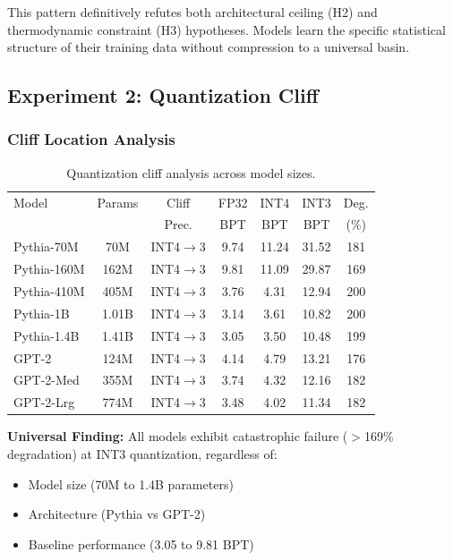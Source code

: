 \documentclass[11pt,a4paper]{article}
\begin{document}
This pattern definitively refutes both architectural ceiling (H2) and thermodynamic constraint (H3) hypotheses. Models learn the specific statistical structure of their training data without compression to a universal basin.

\subsection{Experiment 2: Quantization Cliff}

\subsubsection{Cliff Location Analysis}

\begin{table}[h]
\centering
\small
\begin{tabular}{lcccccc}
\toprule
Model & Params & Cliff & FP32 & INT4 & INT3 & Deg. \\
 & & Prec. & BPT & BPT & BPT & (\%) \\
\midrule
Pythia-70M & 70M & INT4$\rightarrow$3 & 9.74 & 11.24 & 31.52 & 181 \\
Pythia-160M & 162M & INT4$\rightarrow$3 & 9.81 & 11.09 & 29.87 & 169 \\
Pythia-410M & 405M & INT4$\rightarrow$3 & 3.76 & 4.31 & 12.94 & 200 \\
Pythia-1B & 1.01B & INT4$\rightarrow$3 & 3.14 & 3.61 & 10.82 & 200 \\
Pythia-1.4B & 1.41B & INT4$\rightarrow$3 & 3.05 & 3.50 & 10.48 & 199 \\
GPT-2 & 124M & INT4$\rightarrow$3 & 4.14 & 4.79 & 13.21 & 176 \\
GPT-2-Med & 355M & INT4$\rightarrow$3 & 3.74 & 4.32 & 12.16 & 182 \\
GPT-2-Lrg & 774M & INT4$\rightarrow$3 & 3.48 & 4.02 & 11.34 & 182 \\
\bottomrule
\end{tabular}
\caption{Quantization cliff analysis across model sizes.}
\label{tab:quant-cliff}
\end{table}

\textbf{Universal Finding:} All models exhibit catastrophic failure ($>$169\% degradation) at INT3 quantization, regardless of:
\begin{itemize}
\item Model size (70M to 1.4B parameters)
\item Architecture (Pythia vs GPT-2)
\item Baseline performance (3.05 to 9.81 BPT)
\end{itemize}
\end{document}
